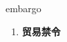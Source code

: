 
\begin{frame}
{\huge embargo}
\begin{center}
\begin{enumerate}\Large
  \item \textbf{贸易禁令}
\end{enumerate}
\end{center}
\end{frame}
